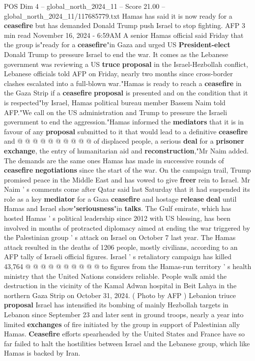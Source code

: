 \begin{textsample}{POS Dim 4 – global\_north\_2024\_11 – Score 21.00 – global\_north\_2024\_11/117685779.txt}  \label{ex:f4_pos_291}
Hamas has said it is now ready for a \textbf{ceasefire} but has demanded Donald Trump push Israel to stop fighting.
AFP 3 min read November 16, 2024 - 6:59AM A senior Hamas official said Friday that the group is"ready for a \textbf{ceasefire}"in Gaza and urged US \textbf{President-elect} Donald Trump to pressure Israel to end the war.
It comes as the Lebanese government was reviewing a US \textbf{truce} \textbf{proposal} in the Israel-Hezbollah conflict, Lebanese officials told AFP on Friday, nearly two months since cross-border clashes escalated into a full-blown war."Hamas is ready to reach a \textbf{ceasefire} in the Gaza Strip if a \textbf{ceasefire} \textbf{proposal} is presented and on the condition that it is respected"by Israel, Hamas political bureau member Bassem Naim told AFP."We call on the US administration and Trump to pressure the Israeli government to end the aggression."Hamas informed the \textbf{mediators} that it is in favour of any \textbf{proposal} submitted to it that would lead to a definitive \textbf{ceasefire} and @ @ @ @ @ @ @ @ @ @ of displaced people, a serious \textbf{deal} for a \textbf{prisoner} \textbf{exchange}, the entry of humanitarian aid and \textbf{reconstruction},"Mr Naim added.
The demands are the same ones Hamas has made in successive rounds of \textbf{ceasefire} \textbf{negotiations} since the start of the war.
On the campaign trail, Trump promised peace in the Middle East and has vowed to give \textbf{freer} rein to Israel.
Mr Naim ' s comments come after Qatar said last Saturday that it had suspended its role as a key \textbf{mediator} for a Gaza \textbf{ceasefire} and hostage \textbf{release} \textbf{deal} until Hamas and Israel show"\textbf{seriousness}"in \textbf{talks}.
The Gulf emirate, which has hosted Hamas ' s political leadership since 2012 with US blessing, has been involved in months of protracted diplomacy aimed at ending the war triggered by the Palestinian group ' s attack on Israel on October 7 last year.
The Hamas attack resulted in the deaths of 1206 people, mostly civilians, according to an AFP tally of Israeli official figures.
Israel ' s retaliatory campaign has killed 43,764 @ @ @ @ @ @ @ @ @ @ to figures from the Hamas-run territory ' s health ministry that the United Nations considers reliable.
People walk amid the destruction in the vicinity of the Kamal Adwan hospital in Beit Lahya in the northern Gaza Strip on October 31, 2024. ( Photo by AFP ) Lebanion triuce \textbf{proposal} Israel has intensified its bombing of mainly Hezbollah targets in Lebanon since September 23 and later sent in ground troops, nearly a year into limited \textbf{exchanges} of fire initiated by the group in support of Palestinian ally Hamas. \textbf{Ceasefire} efforts spearheaded by the United States and France have so far failed to halt the hostilities between Israel and the Lebanese group, which like Hamas is backed by Iran.

\end{textsample}
